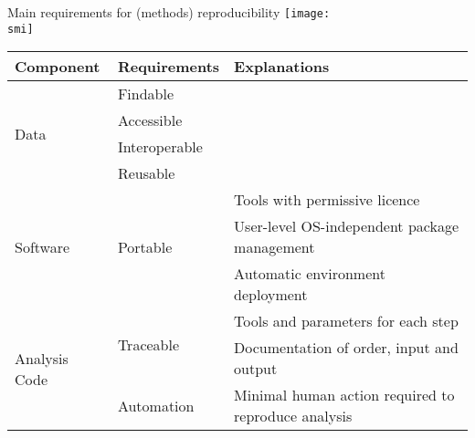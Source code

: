 \documentclass[10pt]{beamer}
\def\smi{out/ln/updir/mw-gcthesis-oral/library.bib}
\begin{document}
\begin{frame}{Main requirements for (methods) reproducibility}
  \def\smi{out/ln/updir/mw-gcthesis-oral/ink/reproducibility/arrow_reproducibility.pdf}
  \texttt{[image: \\smi]}

  {\scriptsize
  \begin{tabular}{@{}lll@{}}
    \toprule
    Component                      & Requirements                & Explanations            \\ \midrule
    \multirow{4}{*}{Data}          & Findable &                                \\
    & Accessible                        &       \\
    & Interoperable                    &        \\ 
    & Reusable                          &       \\ \midrule
    \multirow{3}{*}{Software}             & \multirow{3}{*}{Portable} & Tools with permissive licence \\
    & & User-level OS-independent package management            \\
    & & Automatic environment deployment           \\ \midrule
    \multirow{3}{*}{Analysis Code} & \multirow{2}{*}{Traceable} & Tools and parameters for each step       \\
    & & Documentation of order, input and output \\
    & Automation & Minimal human action required to reproduce analysis \\ \bottomrule
  \end{tabular}
  }
\end{frame}
\end{document}
